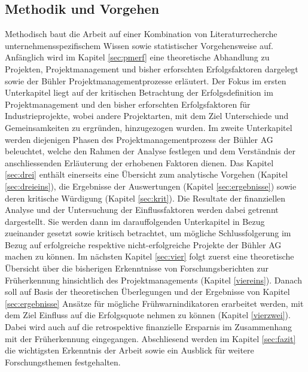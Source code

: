 \subsection{Methodik und Vorgehen}
Methodisch baut die Arbeit auf einer Kombination von Literaturrecherche unternehmensspezifischem Wissen sowie statistischer Vorgehensweise auf.
\newline
Anfänglich wird im Kapitel \ref{sec:pmerf} eine theoretische Abhandlung zu Projekten, Projektmanagement und bisher erforschten Erfolgsfaktoren dargelegt sowie der Bühler Projektmanagementprozesse erläutert. Der Fokus im ersten Unterkapitel liegt auf der kritischen Betrachtung der Erfolgsdefinition im Projektmanagement und den bisher erforschten Erfolgsfaktoren für Industrieprojekte, wobei andere Projektarten, mit dem Ziel Unterschiede und Gemeinsamkeiten zu ergründen, hinzugezogen wurden. Im zweite Unterkapitel werden diejenigen Phasen des Projektmanagementprozess der Bühler AG beleuchtet, welche den Rahmen der Analyse festlegen und dem Verständnis der anschliessenden Erläuterung der erhobenen Faktoren dienen.
\newline
Das Kapitel \ref{sec:drei} enthält einerseits eine Übersicht zum analytische Vorgehen (Kapitel \ref{sec:dreieins}), die Ergebnisse der Auswertungen (Kapitel \ref{sec:ergebnisse}) sowie deren kritische Würdigung (Kapitel \ref{sec:krit}). Die Resultate der finanziellen Analyse und der Untersuchung der Einflussfaktoren werden dabei getrennt dargestellt. Sie werden dann im darauffolgenden Unterkapitel in Bezug zueinander gesetzt sowie kritisch betrachtet, um mögliche Schlussfolgerung im Bezug auf erfolgreiche respektive nicht-erfolgreiche Projekte der Bühler AG machen zu können.
\newline
Im nächsten Kapitel \ref{sec:vier} folgt zuerst eine theoretische Übersicht über die bisherigen Erkenntnisse von Forschungsberichten zur Früherkennung hinsichtlich des Projektmanagements (Kapitel \ref{viereins}). Danach soll auf Basis der theoretischen Überlegungen und der Ergebnisse von Kapitel \ref{sec:ergebnisse} Ansätze für mögliche Frühwarnindikatoren erarbeitet werden, mit dem Ziel Einfluss auf die Erfolgsquote nehmen zu können (Kapitel \ref{vierzwei}). Dabei wird auch auf die retrospektive finanzielle Ersparnis im Zusammenhang mit der Früherkennung eingegangen.
\newline
Abschliesend werden im Kapitel \ref{sec:fazit} die wichtigsten Erkenntnis der Arbeit sowie ein Ausblick für weitere Forschungsthemen festgehalten.

	





